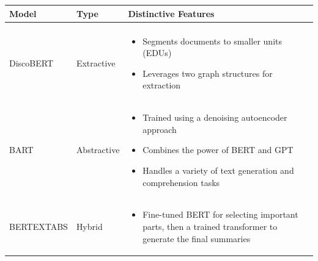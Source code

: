 \documentclass{beamer}
\begin{document}
\begin{frame}
\begin{table}[h!]
    \footnotesize
    \centering
    \begin{tabular}{p{2cm}p{1cm}p{8cm}}
        \hline
        \textbf{Model} & \textbf{Type} & \textbf{\:\:\:\:Distinctive Features} \\ \hline \\
        DiscoBERT {\tiny \citep{DiscoBERT}} & Extractive & \vspace{-\baselineskip} %
        \begin{itemize}
            \setlength{\itemsep}{0pt}%
            \setlength{\topsep}{0pt}%
            \item Segments documents to smaller units (EDUs)
            \item Leverages two graph structures for extraction
        \end{itemize} \\ 
        BART \: \: \: \: \:{\tiny \citep{bart}} & Abstractive & \vspace{-\baselineskip} %
        \begin{itemize}
            \item Trained using a denoising autoencoder approach
            \item Combines the power of BERT and GPT
            \item Handles a variety of text generation and comprehension tasks
        \end{itemize} \\
        BERTEXTABS {\tiny \citep{BertSum}} & Hybrid & \vspace{-\baselineskip} %
        \begin{itemize}
            \item Fine-tuned BERT for selecting important parts, then a trained transformer to generate the final summaries
        \end{itemize} \\ \hline
    \end{tabular}
\end{table}



 

\end{frame}
\end{document}
